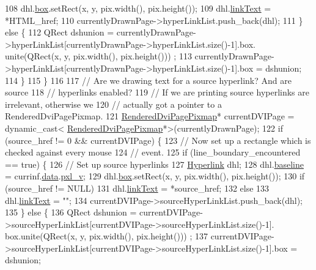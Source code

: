 \begin{DoxyCode}
108       dhl.\hyperlink{classHyperlink_ad7a3e8de8ad043dd8bbfb65eb963c72d}{box}.setRect(x, y, pix.width(), pix.height());
109       dhl.\hyperlink{classHyperlink_a9aa732893dfb8f1c253132dca07cb052}{linkText} = *HTML\_href;
110       currentlyDrawnPage->hyperLinkList.push\_back(dhl);
111     \} \textcolor{keywordflow}{else} \{
112       QRect dshunion = currentlyDrawnPage->hyperLinkList[currentlyDrawnPage->hyperLinkList.size()-1].box.
      unite(QRect(x, y, pix.width(), pix.height())) ;
113       currentlyDrawnPage->hyperLinkList[currentlyDrawnPage->hyperLinkList.size()-1].box = dshunion;
114     \}
115   \}
116 
117   \textcolor{comment}{// Are we drawing text for a source hyperlink? And are source}
118   \textcolor{comment}{// hyperlinks enabled?}
119   \textcolor{comment}{// If we are printing source hyperlinks are irrelevant, otherwise we}
120   \textcolor{comment}{// actually got a pointer to a RenderedDviPagePixmap.}
121   \hyperlink{dviPageInfo_8h_ac16fb3ec8d590bf2412bda0e176a2e65}{RenderedDviPagePixmap}* currentDVIPage = \textcolor{keyword}{dynamic\_cast<}
      \hyperlink{dviPageInfo_8h_ac16fb3ec8d590bf2412bda0e176a2e65}{RenderedDviPagePixmap}*\textcolor{keyword}{>}(currentlyDrawnPage);
122   \textcolor{keywordflow}{if} (source\_href != 0 && currentDVIPage) \{
123     \textcolor{comment}{// Now set up a rectangle which is checked against every mouse}
124     \textcolor{comment}{// event.}
125     \textcolor{keywordflow}{if} (line\_boundary\_encountered == \textcolor{keyword}{true}) \{
126       \textcolor{comment}{// Set up source hyperlinks}
127       \hyperlink{classHyperlink}{Hyperlink} dhl;
128       dhl.\hyperlink{classHyperlink_aec2a7167f48623f38d3c628e0ebb298f}{baseline} = currinf.\hyperlink{structdrawinf_af73f66288002f0a25c7843a534bf1340}{data}.\hyperlink{structframedata_a0e7316fa88b0240baa7ce526650131a9}{pxl\_v};
129       dhl.\hyperlink{classHyperlink_ad7a3e8de8ad043dd8bbfb65eb963c72d}{box}.setRect(x, y, pix.width(), pix.height());
130       \textcolor{keywordflow}{if} (source\_href != NULL)
131         dhl.\hyperlink{classHyperlink_a9aa732893dfb8f1c253132dca07cb052}{linkText} = *source\_href;
132       \textcolor{keywordflow}{else}
133         dhl.\hyperlink{classHyperlink_a9aa732893dfb8f1c253132dca07cb052}{linkText} = \textcolor{stringliteral}{""};
134       currentDVIPage->sourceHyperLinkList.push\_back(dhl);
135     \} \textcolor{keywordflow}{else} \{
136       QRect dshunion = currentDVIPage->sourceHyperLinkList[currentDVIPage->sourceHyperLinkList.size()-1].
      box.unite(QRect(x, y, pix.width(), pix.height())) ;
137       currentDVIPage->sourceHyperLinkList[currentDVIPage->sourceHyperLinkList.size()-1].box = dshunion;

\end{DoxyCode}
